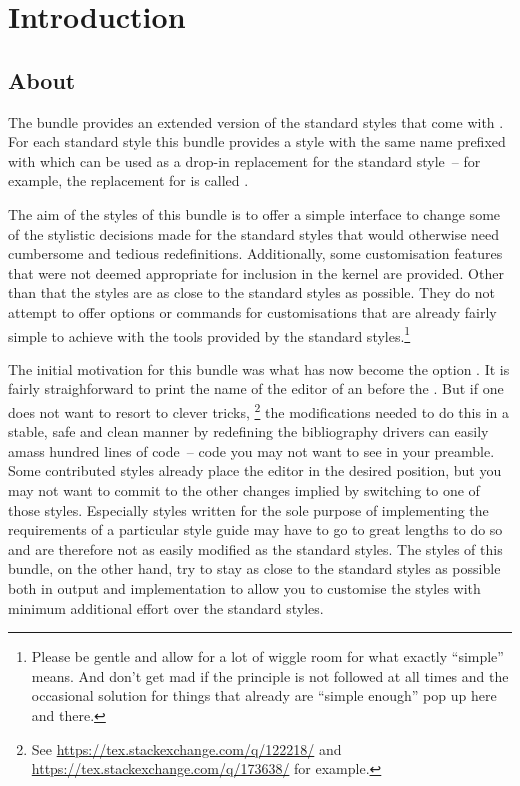\documentclass[DIV=9]{scrartcl}
\providecommand*{\printtitlepage}{}
\begin{document}
\printtitlepage
\tableofcontents

\section{Introduction}\label{sec:int}
\subsection{About}
The  bundle provides an extended version of the standard
styles that come with .
For each standard style this bundle provides a style with the same name
prefixed with  which can be used as a drop-in replacement for the
standard style~-- for example, the replacement for 
is called .

The aim of the styles of this bundle is to offer a simple interface to change
some of the stylistic decisions made for the standard styles that would
otherwise need cumbersome and tedious redefinitions.
Additionally, some customisation features that were not deemed appropriate
for inclusion in the  kernel are provided.
Other than that the styles are as close to the standard styles as possible.
They do not attempt to offer options or commands for customisations that
are already fairly simple to achieve with the tools provided by the standard
styles.\footnote{Please be gentle and allow for a lot of wiggle room for what
exactly \enquote{simple} means. And don't get mad if the principle is not
followed at all times and the occasional solution for things that already are
\enquote{simple enough} pop up here and there.}

The initial motivation for this bundle was what has now become the option
.
It is fairly straighforward to print the name of the editor of an
 before the .
But if one does not want to resort to clever tricks,%
\footnote{See \url{https://tex.stackexchange.com/q/122218/} and
\url{https://tex.stackexchange.com/q/173638/} for example.}
the modifications needed to do this in a stable, safe and clean manner by
redefining the bibliography drivers can easily amass hundred lines of code~--
code you may not want to see in your preamble.
Some contributed  styles already place the editor in the
desired position, but you may not want to commit to the other changes implied
by switching to one of those styles.
Especially styles written for the sole purpose of implementing the requirements
of a particular style guide may have to go to great lengths to do so and are
therefore not as easily modified as the standard styles.
The styles of this bundle, on the other hand, try to stay as close to the
standard styles as possible both in output and implementation to allow you
to customise the styles with minimum additional effort over the standard styles.
\end{document}
